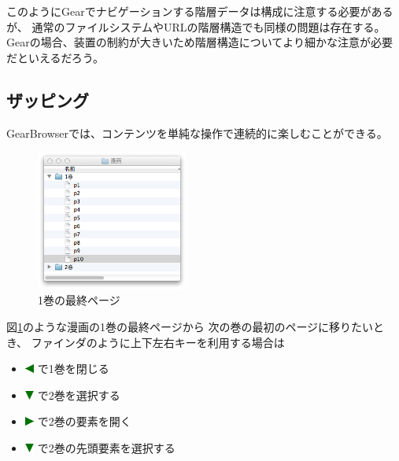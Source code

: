 \documentclass[twoside]{wiss}
\def\GEAR{\textsf{Gear}}
\def\GB{\textsf{GearBrowser}}
\def\figwidth{50mm}
\def\down{ \includegraphics[width=3mm,bb=0 0 36 36]{figures/downtriangle.pdf} }
\def\right{ \includegraphics[width=3mm,bb=0 0 36 36]{figures/righttriangle.pdf} }
\def\left{ \includegraphics[width=3mm,bb=0 0 36 36]{figures/lefttriangle.pdf} }
\begin{document}
このように{\GEAR}でナビゲーションする階層データは構成に注意する必要があるが、
通常のファイルシステムやURLの階層構造でも同様の問題は存在する。
{\GEAR}の場合、装置の制約が大きいため階層構造についてより細かな注意が必要だといえるだろう。

\subsection{ザッピング}


{\GB}では、コンテンツを単純な操作で連続的に楽しむことができる。

\begin{figure}[H]
\centerline{\includegraphics[width=\figwidth,bb=0 0 344 318]{figures/9a8615b0242c9ba4deb77ca30ab94d7c.png}}
\caption{1巻の最終ページ}
\label{manga1}
\end{figure}

\noindent
図\ref{manga1}のような漫画の1巻の最終ページから
次の巻の最初のページに移りたいとき、
ファインダのように上下左右キーを利用する場合は

\begin{itemize}
\item {\left}で1巻を閉じる
\item {\down}で2巻を選択する
\item {\right}で2巻の要素を開く
\item {\down}で2巻の先頭要素を選択する
\end{itemize}
\end{document}
